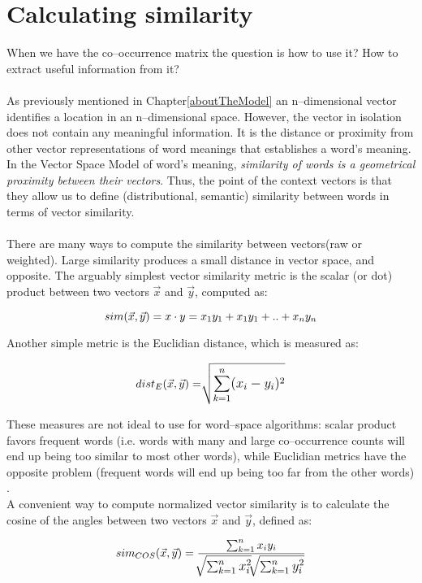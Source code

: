\section{Calculating similarity}
When we have the co--occurrence matrix the question is how to use it? How to extract useful information from it? 
\\\\
As previously mentioned in Chapter\ref{aboutTheModel} an n--dimensional vector identifies a location in 
an n--dimensional space. However, the vector in isolation does not contain any meaningful information. It is 
the distance or proximity from other vector representations of word meanings that establishes a word's 
meaning. In the Vector Space Model of word's meaning, \textit{similarity of words is a geometrical 
proximity between their vectors}. Thus, the point of the context vectors is that they allow us to define 
(distributional, semantic) similarity between words in terms of vector similarity.
\\\\  
There are many ways to compute the similarity between vectors(raw or weighted). Large similarity 
produces a small distance in vector space, and opposite. The arguably simplest vector similarity metric is 
the scalar (or dot) product between two vectors $\vec x$ and $\vec y$, computed as:
\begin{center}
\begin{equation}
\large{
sim(\vec x,\vec y) = x \cdot y = x_{1}y_{1} + x_{1}y_{1}+ .. + x_{n}y_{n}
}
\end{equation}
\end{center}
Another simple metric is the Euclidian distance, which is measured as:
\begin{center}
\begin{equation}
\large{
dist_{E}(\vec x ,\vec y) =  \sqrt []{\sum_{k=1}^n (x_{i}-y_{i})^{2}}  
}
\end{equation}
\end{center}
These measures are not ideal to use for word--space algorithms: scalar product favors frequent words (i.e. words with many and large co--occurrence counts will end up being too similar to most other words), while Euclidian metrics have the opposite problem (frequent words will end up being too far from the other words)\cite{widdows04}  .
\\A convenient way to compute normalized vector similarity is to calculate the cosine of the angles between two vectors $\vec x$ and $\vec y$, defined as:
\begin{center}
\begin{equation}
\large{
sim_{COS}(\vec x ,\vec y) =  \frac{\sum_{k=1}^n x_{i}y_{i} }{\sqrt []{\sum_{k=1}^n x_{i}^{2}} \sqrt []{\sum_{k=1}^n y_{i}^{2}}} 
}
\end{equation}
\end{center}

